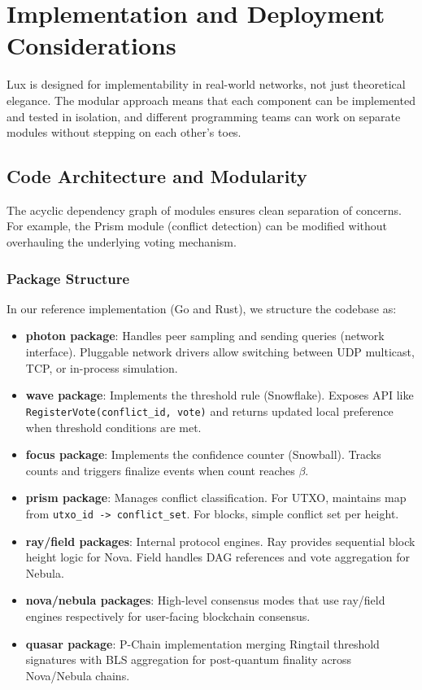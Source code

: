\section{Implementation and Deployment Considerations}

Lux is designed for implementability in real-world networks, not just theoretical elegance. The modular approach means that each component can be implemented and tested in isolation, and different programming teams can work on separate modules without stepping on each other's toes.

\subsection{Code Architecture and Modularity}

The acyclic dependency graph of modules ensures clean separation of concerns. For example, the Prism module (conflict detection) can be modified without overhauling the underlying voting mechanism.

\subsubsection{Package Structure}

In our reference implementation (Go and Rust), we structure the codebase as:

\begin{itemize}
\item \textbf{photon package}: Handles peer sampling and sending queries (network interface). Pluggable network drivers allow switching between UDP multicast, TCP, or in-process simulation.

\item \textbf{wave package}: Implements the threshold rule (Snowflake). Exposes API like \texttt{RegisterVote(conflict\_id, vote)} and returns updated local preference when threshold conditions are met.

\item \textbf{focus package}: Implements the confidence counter (Snowball). Tracks counts and triggers finalize events when count reaches $\beta$.

\item \textbf{prism package}: Manages conflict classification. For UTXO, maintains map from \texttt{utxo\_id -> conflict\_set}. For blocks, simple conflict set per height.

\item \textbf{ray/field packages}: Internal protocol engines. Ray provides sequential block height logic for Nova. Field handles DAG references and vote aggregation for Nebula.

\item \textbf{nova/nebula packages}: High-level consensus modes that use ray/field engines respectively for user-facing blockchain consensus.

\item \textbf{quasar package}: P-Chain implementation merging Ringtail threshold signatures with BLS aggregation for post-quantum finality across Nova/Nebula chains.
\end{itemize}

